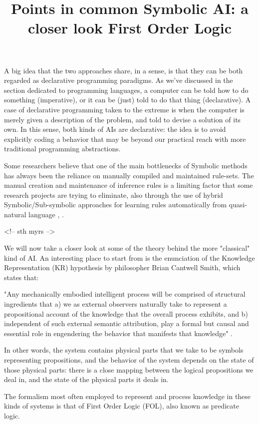 \title{ Points in common}

A big idea that the two approaches share, in a sense, is that they can be both regarded as declarative programming paradigms. As we've discussed in the section dedicated to programming languages, a computer can be told how to do something (imperative), or it can be (just) told to do that thing (declarative). A case of declarative programming taken to the extreme is when the computer is merely given a description of the problem, and told to devise a solution of its own. In this sense, both kinds of AIs are declarative: the idea is to avoid explicitly coding a behavior that may be beyond our practical reach with more traditional programming abstractions.

Some researchers believe that one of the main bottlenecks of Symbolic methods has always been the reliance on manually compiled and maintained rule-sets. The manual creation and maintenance of inference rules is a limiting factor that some research projects are trying to eliminate, also through the use of hybrid Symbolic/Sub-symbolic approaches for learning rules automatically from quasi-natural language \cite{ilkou2020symbolic}, \cite{yang2021learning}.

\title{ Symbolic AI: a closer look}

<!-- sth myrs -->

We will now take a closer look at some of the theory behind the more "classical" kind of AI. An interesting place to start from is the enunciation of the Knowledge Representation (KR) hypothesis by philosopher Brian Cantwell Smith, which states that:

"Any mechanically embodied intelligent process will be comprised of
structural ingredients that a) we as external observers naturally take to
represent a propositional account of the knowledge that the overall
process exhibits, and b) independent of such external semantic attribution, play a formal but causal and essential role in engendering
the behavior that manifests that knowledge" \cite{brachman2022machines}.

In other words, the system contains physical parts that we take to be symbols representing propositions, and the behavior of the system depends on the state of those physical parts: there is a close mapping between the logical propositions we deal in, and the state of the physical parts it deals in.

\title{ First Order Logic}

The formalism most often employed to represent and process knowledge in these kinds of systems is that of First Order Logic (FOL), also known as predicate logic.

